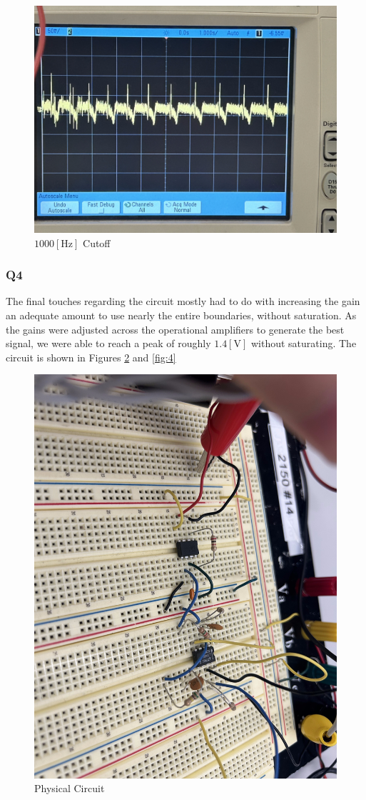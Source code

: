 \documentclass[
	letterpaper, %
	10pt, %
]{CSUniSchoolLabReport}
\begin{document}
\begin{figure}[H]
  \centering
  \includegraphics[width=.9\textwidth]{Figures/L15Q3-2.jpg}
  \caption{$1000[\si{\hertz}]$ Cutoff}
  \label{fig:2}
\end{figure}

\subsubsection{Q4} The final touches regarding the circuit mostly had to do with increasing the gain an adequate amount to use nearly the entire boundaries, without saturation. As the gains were adjusted across the operational amplifiers to generate the best signal, we were able to reach a peak of roughly $1.4[\si{\volt}]$ without saturating. The circuit is shown in Figures \ref{fig:3} and \ref{fig:4}

\begin{figure}[H]
  \centering
  \includegraphics[width=.5\textwidth,angle=90]{Figures/L15Q4.jpg}
  \caption{Physical Circuit}
  \label{fig:3}
\end{figure}
\end{document}
